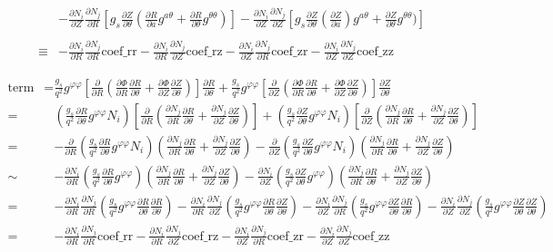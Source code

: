 \documentclass{report}
\newcommand{\ff}[2]{\frac{#1}{#2}}
\newcommand{\pp}[2]{\frac{\partial{#1}}{\partial{#2}}}
\begin{document}
\begin{equation}
\begin{array}{rl}
\\
& \\
&-\pp{N_i}{Z}\pp{N_j}{R} \left[g_s \pp{Z}{\theta} (\pp{R}{a}  g^{a \theta} + \pp{R}{\theta} g^{\theta \theta}) \right]
 -\pp{N_i}{Z}\pp{N_j}{Z} \left[g_s \pp{Z}{\theta} (\pp{Z}{a}) g^{a \theta} + \pp{Z}{\theta} g^{\theta \theta}) \right]
\\
& \\
\equiv &
 -\pp{N_i}{R}\pp{N_j}{R} \mbox{coef\_rr}
 -\pp{N_i}{R}\pp{N_j}{Z} \mbox{coef\_rz}
 -\pp{N_i}{Z}\pp{N_j}{R} \mbox{coef\_zr}
 -\pp{N_i}{Z}\pp{N_j}{Z} \mbox{coef\_zz}
   \end{array}
\end{equation}

\begin{equation}
\label{eq:poisson7-term3}
   \begin{array}{rl}
\mbox{term \#3}= 
&
 \ff{g_s}{q^2} g^{\varphi \varphi} [\pp{}{R} (\pp{\Phi}{R} \pp{R}{\theta} + \pp{\Phi}{Z} \pp{Z}{\theta})] \pp{R}{\theta} +
 \ff{g_s}{q^2} g^{\varphi \varphi} [\pp{}{Z} (\pp{\Phi}{R} \pp{R}{\theta} + \pp{\Phi}{Z} \pp{Z}{\theta})] \pp{Z}{\theta}
\\
=& (\ff{g_s}{q^2} \pp{R}{\theta} g^{\varphi \varphi} N_i) [\pp{}{R} (\pp{N_j}{R} \pp{R}{\theta} + \pp{N_j}{Z} \pp{Z}{\theta})] +
   (\ff{g_s}{q^2} \pp{Z}{\theta} g^{\varphi \varphi} N_i) [\pp{}{Z} (\pp{N_j}{R} \pp{R}{\theta} + \pp{N_j}{Z} \pp{Z}{\theta})]
\\
=&-\pp{}{R} (\ff{g_s}{q^2} \pp{R}{\theta} g^{\varphi \varphi} N_i) (\pp{N_j}{R} \pp{R}{\theta} + \pp{N_j}{Z} \pp{Z}{\theta})
  -\pp{}{Z} (\ff{g_s}{q^2} \pp{Z}{\theta} g^{\varphi \varphi} N_i) (\pp{N_j}{R} \pp{R}{\theta} + \pp{N_j}{Z} \pp{Z}{\theta})
\\
\sim & -\pp{N_i}{R} (\ff{g_s}{q^2} \pp{R}{\theta} g^{\varphi \varphi} ) (\pp{N_j}{R} \pp{R}{\theta} + \pp{N_j}{Z} \pp{Z}{\theta})
       -\pp{N_i}{Z} (\ff{g_s}{q^2} \pp{Z}{\theta} g^{\varphi \varphi} ) (\pp{N_j}{R} \pp{R}{\theta} + \pp{N_j}{Z} \pp{Z}{\theta})
\\
=& -\pp{N_i}{R}\pp{N_j}{R} (\ff{g_s}{q^2} g^{\varphi \varphi} \pp{R}{\theta} \pp{R}{\theta})
   -\pp{N_i}{R}\pp{N_j}{Z} (\ff{g_s}{q^2} g^{\varphi \varphi} \pp{R}{\theta} \pp{Z}{\theta})
   -\pp{N_i}{Z}\pp{N_j}{R} (\ff{g_s}{q^2} g^{\varphi \varphi} \pp{Z}{\theta} \pp{R}{\theta})
   -\pp{N_i}{Z}\pp{N_j}{Z} (\ff{g_s}{q^2} g^{\varphi \varphi} \pp{Z}{\theta} \pp{Z}{\theta})
\\
=& -\pp{N_i}{R}\pp{N_j}{R} \mbox{coef\_rr}
   -\pp{N_i}{R}\pp{N_j}{Z} \mbox{coef\_rz}
   -\pp{N_i}{Z}\pp{N_j}{R} \mbox{coef\_zr}
   -\pp{N_i}{Z}\pp{N_j}{Z} \mbox{coef\_zz}
   \end{array}
\end{equation}
\end{document}
